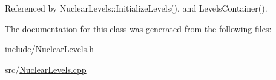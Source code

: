 Referenced by Nuclear\-Levels\-::\-Initialize\-Levels(), and Levels\-Container().



The documentation for this class was generated from the following files\-:\begin{DoxyCompactItemize}
\item 
include/\hyperlink{NuclearLevels_8h}{Nuclear\-Levels.\-h}\item 
src/\hyperlink{NuclearLevels_8cpp}{Nuclear\-Levels.\-cpp}\end{DoxyCompactItemize}
